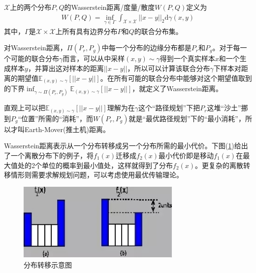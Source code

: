             \begin{definition}[Wasserstein距离]
            $\mathcal{X}$上的两个分布$P,Q$的Wasserstein距离/度量/散度$W(P,Q)$定义为
            \begin{align*}
            W(P,Q) = \inf_{\gamma \in \Gamma}\int_{\mathcal{X}\times \mathcal{X}}||x-y||_2\mathrm{d}\gamma(x,y)
            \end{align*}
            其中，$\Gamma$是$\mathcal{X}\times \mathcal{X}$上所有具有边界分布$P$和$Q$的联合分布集。
            \end{definition}
            \par
            对Wasserstein距离，$\Pi (P_r, P_g)$中每一个分布的边缘分布都是$P_r$和$P_g$。对于每一个可能的联合分布$\gamma$而言，可以从中采样$(x, y) \sim \gamma$得到一个真实样本$x$和一个生成样本$y$，并算出这对样本的距离$||x-y||$，所以可以计算该联合分布$\gamma$下样本对距离的期望值$\mathbb{E}_{(x, y) \sim \gamma} [||x - y||]$。在所有可能的联合分布中能够对这个期望值取到的下界$\inf_{\gamma \sim \Pi (P_r, P_g)} \mathbb{E}_{(x, y) \sim \gamma} [||x - y||]$，就定义了Wasserstein距离。
            \par
            直观上可以把$\mathbb{E}_{(x, y) \sim \gamma} [||x - y||]$理解为在$\gamma$这个“路径规划”下把$P_r$这堆“沙土”挪到$P_g$“位置”所需的“消耗”，而$W(P_r, P_g)$就是“最优路径规划”下的“最小消耗”，所以才叫Earth-Mover(推土机)距离。
            \par
            Wasserstein距离表示从一个分布转移成另一个分布所需的最小代价。下图(\ref{fig:Wasserstein距离：分布转移示意图})给出了一个离散分布下的例子，将$f_1(x)$迁移成$f_2(x)$最小代价即是移动$f_1(x)$在最大值处的2个单位的概率到最小值处，这样就得到了分布$f_2(x)$。更复杂的离散转移情形则需要求解规划问题，可以考虑使用最优传输理论。
                \begin{figure}[H]
                \centering
                \includegraphics[width=8cm]{images/Wasserstein_distribution.jpg}
                \caption{分布转移示意图}
                \label{fig:Wasserstein距离：分布转移示意图}
                \end{figure}
